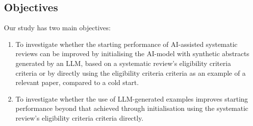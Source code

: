 \documentclass[12pt]{article}
\begin{document}


\subsection{Objectives}

Our study has two main objectives:

\begin{enumerate}
  \item To investigate whether the starting performance of AI-assisted systematic reviews can be improved by initialising the AI-model with synthetic abstracts generated by an LLM, based on a systematic review's eligibility criteria criteria or by directly using the eligibility criteria criteria as an example of a relevant paper, compared to a cold start.
  \item To investigate whether the use of LLM-generated examples improves starting performance beyond that achieved through initialisation using the systematic review's eligibility criteria criteria directly.
\end{enumerate}



\end{document}
